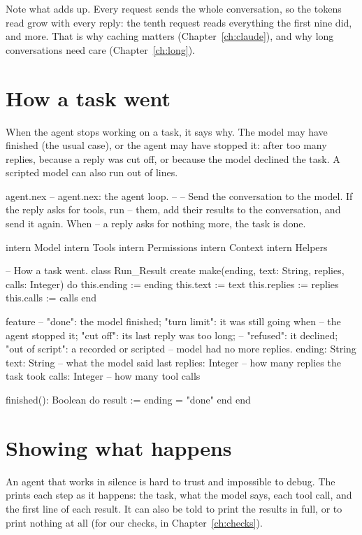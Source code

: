 Note what  adds up. Every request sends the whole conversation,
so the tokens read grow with every reply: the tenth request reads
everything the first nine did, and more. That is why caching matters
(Chapter~\ref{ch:claude}), and why long conversations need care
(Chapter~\ref{ch:long}).

\section{How a task went}

When the agent stops working on a task, it says why. The model may have
finished (the usual case), or the agent may have stopped it: after too
many replies, because a reply was cut off, or because the model declined
the task. A scripted model can also run out of lines.

\begin{newfile}{agent.nex}
-- agent.nex: the agent loop.
--
-- Send the conversation to the model. If the reply asks for tools, run
-- them, add their results to the conversation, and send it again. When
-- a reply asks for nothing more, the task is done.

intern Model
intern Tools
intern Permissions
intern Context
intern Helpers

-- How a task went.
class Run_Result
create
  make(ending, text: String, replies, calls: Integer) do
    this.ending := ending
    this.text := text
    this.replies := replies
    this.calls := calls
  end

feature
  -- "done": the model finished; "turn limit": it was still going when
  -- the agent stopped it; "cut off": its last reply was too long;
  -- "refused": it declined; "out of script": a recorded or scripted
  -- model had no more replies.
  ending: String
  text: String      -- what the model said last
  replies: Integer  -- how many replies the task took
  calls: Integer    -- how many tool calls

  finished(): Boolean do
    result := ending = "done"
  end
end
\end{newfile}

\section{Showing what happens}

An agent that works in silence is hard to trust and impossible to debug.
The  prints each step as it happens: the task, what the
model says, each tool call, and the first line of each result. It can also
be told to print the results in full, or to print nothing at all (for our
checks, in Chapter~\ref{ch:checks}).

